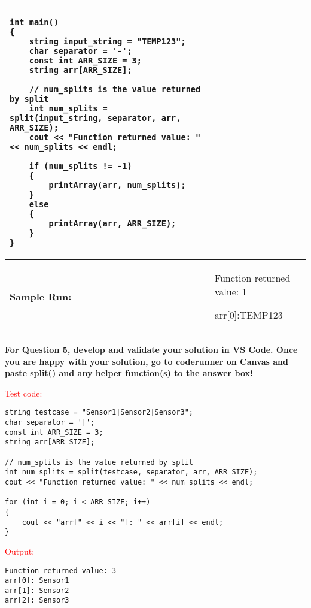 \begin{longtable}[H]{|p{1.7in}|p{4.0in}|}
\begin{example}
\begin{verbatim}
int main()
{
    string input_string = "TEMP123";
    char separator = '-';
    const int ARR_SIZE = 3;
    string arr[ARR_SIZE];
    
    // num_splits is the value returned by split
    int num_splits = split(input_string, separator, arr, ARR_SIZE);
    cout << "Function returned value: " << num_splits << endl;

    if (num_splits != -1)
    {
        printArray(arr, num_splits);
    }
    else
    {
        printArray(arr, ARR_SIZE);
    }
}

        \end{verbatim}
                \end{example} 

\\ \hline
        \textbf{Sample Run:} &  
        \begin{sample}
Function returned value: 1

arr[0]:TEMP123
        \end{sample}

             \\ \hline
\end{longtable}


\textbf{For Question 5, develop and validate your solution in VS Code. Once you are happy with your solution, go to coderunner on Canvas and paste split() and any helper function(s) to the answer box!}

\begin{sample}
\textcolor{red}{Test code:}
\begin{verbatim}
string testcase = "Sensor1|Sensor2|Sensor3";
char separator = '|';
const int ARR_SIZE = 3;
string arr[ARR_SIZE];

// num_splits is the value returned by split
int num_splits = split(testcase, separator, arr, ARR_SIZE);
cout << "Function returned value: " << num_splits << endl;

for (int i = 0; i < ARR_SIZE; i++)
{
    cout << "arr[" << i << "]: " << arr[i] << endl;
}
\end{verbatim}
\textcolor{red}{Output:}
\begin{verbatim}
Function returned value: 3  
arr[0]: Sensor1  
arr[1]: Sensor2  
arr[2]: Sensor3  
\end{verbatim}
\end{sample}

